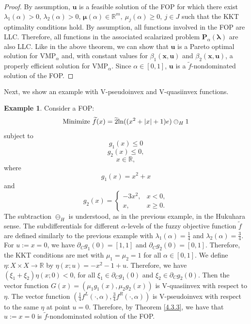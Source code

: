 \documentclass{article}
\theoremstyle{definition}
\newtheorem{example}[maar]{Example}
\begin{document}
\begin{proof} By assumption, $\boldsymbol u$ is a feasible solution of the FOP for which there exist $\lambda_1(\alpha) > 0$, $\lambda_2(\alpha) > 0$, $\boldsymbol { \mu}(\alpha)\in \mathbb R^{m},\ \mu_j(\alpha) \geq 0,\ j \in J$  such that the KKT optimality conditions hold. By assumption, all functions involved in the FOP are LLC. Therefore, all functions in the associated scalarized problem $\boldsymbol P_{\alpha}( {\boldsymbol \lambda})$ are also LLC. Like in the above theorem, we can show that $\boldsymbol u$ is a Pareto optimal solution for VMP$_{\alpha}$ and, with constant values for $\beta_1(\boldsymbol x, \boldsymbol u)$ and $\beta_2(\boldsymbol x, \boldsymbol u)$, a properly efficient solution for VMP$_{\alpha}$. Since $\alpha \in [0,1]$, $\boldsymbol u$ is a $\tilde f$-nondominated solution of the FOP. 
\end{proof}

Next, we show an example with V-pseudoinvex and V-quasiinvex functions.
\begin{example}\label{5.2.6} Consider a FOP:
$$\textnormal{Minimize}\ \widetilde f(x) = \widetilde 2 \textnormal{ln}((x^2 + |x| + 1)e)\ominus_H  1$$
subject to
$$g_1(x) \leq 0$$
$$g_2(x) \leq 0,$$
$$x\in \mathbb R,$$
where $$g_1(x) = x^2 + x$$ and
$$g_2(x) = \begin{cases} -3x^2, & x < 0, \\
x, & x \geq 0.
\end{cases}$$
The subtraction $\ominus_H$ is understood, as in the previous example, in the Hukuhara sense. The subdifferentials for different $\alpha$-levels of the fuzzy objective function $\widetilde f$ are defined similarly to the previous example with $ \lambda_1(\alpha) = \frac{1}{4}$ and $ \lambda_2(\alpha) = \frac{3}{4}$. For $u:=x=0$, we have $\partial_C g_1(0) = [1,1]$ and $\partial_C g_2(0) = [0,1]$. Therefore, the KKT conditions are met with $\mu_1 = \mu_2 = 1$ for all $\alpha \in [0,1]$. We define $\eta: X \times X \rightarrow \mathbb R$ by $\eta(x;u) = -x^2 - 1 +u$. Therefore, we have $(\xi_1 + \xi_2)\eta(x;0) < 0$, for all $\xi_1 \in \partial_C g_1(0)$ and $\xi_2 \in \partial_C g_2(0)$. Then the vector function $G(x) = (\mu_1 g_1(x), \mu_2 g_2(x))$ is V-quasiinvex with respect to $\eta$. The vector function $(\frac{1}{4}f^L(\cdot,\alpha), \frac{3}{4}f^R(\cdot,\alpha))$ is V-pseudoinvex with respect to the same $\eta$ at point $u=0$. Therefore, by Theorem \ref{4.3.3}, we have that $u:=x=0$ is $\tilde f$-nondominated solution of the FOP.
\end{example}
\end{document}
